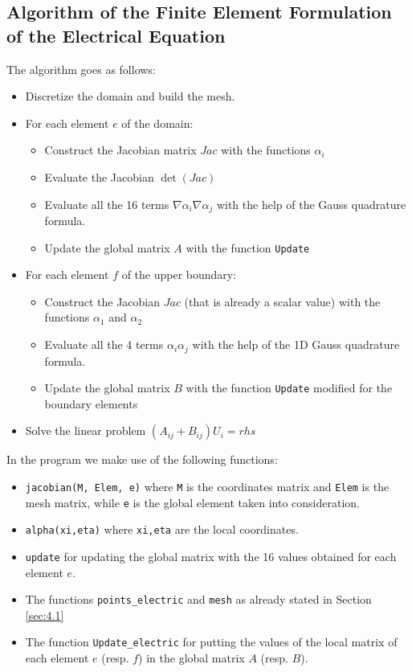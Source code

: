 \subsection{Algorithm of the Finite Element Formulation of the Electrical Equation}
\begin{mdframed}
	The algorithm goes as follows:
	\begin{itemize}
		\item Discretize the domain and build the mesh.
		\item For each element $ e $ of the domain:
		\begin{itemize}
			\item Construct the Jacobian matrix $ Jac $ with the functions $ \alpha_i $
			\item Evaluate the Jacobian $ \det(Jac) $
			\item Evaluate all the 16 terms $ \nabla\alpha_i\nabla\alpha_j $ with the help of the Gauss quadrature formula.
			\item Update the global matrix $ A $ with the function \texttt{Update}
		\end{itemize}
		\item For each element $ f $ of the upper boundary:
		\begin{itemize}
			\item Construct the Jacobian $ Jac $ (that is already a scalar value) with the functions $ \alpha_1 $ and $ \alpha_2 $
			\item Evaluate all the 4 terms $ \alpha_i\alpha_j $ with the help of the 1D Gauss quadrature formula.
			\item Update the global matrix $ B $ with the function \texttt{Update} modified for the boundary elements
		\end{itemize}
		\item Solve the linear problem $ (A_{ij}+B_{ij})U_i = rhs $
	\end{itemize}
\end{mdframed}


In the program we make use of the following functions:
\begin{itemize}
	\item \texttt{jacobian(M, Elem, e)} where \texttt{M} is the coordinates matrix and \texttt{Elem} is the mesh matrix, while \texttt{e} is the global element taken into consideration.
	\item \texttt{alpha(xi,eta)} where \texttt{xi,eta} are the local coordinates.
	\item \texttt{update} for updating the global matrix with the 16 values obtained for each element $ e $. 
	\item The functions \texttt{points\_electric} and \texttt{mesh} as already stated in Section \ref{sec:4.1} 
	\item The function \texttt{Update\_electric} for putting the values of the local matrix of each element $ e $ (resp. $ f $) in the global matrix $ A $ (resp. $ B $).
\end{itemize}



